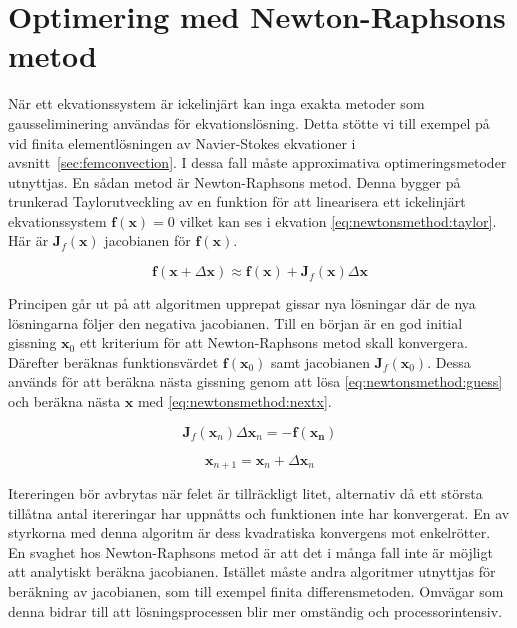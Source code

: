 \section{Optimering med Newton-Raphsons metod}

När ett ekvationssystem är ickelinjärt kan inga exakta metoder som gausseliminering användas
för ekvationslösning. Detta stötte vi till exempel på vid finita elementlösningen
av Navier-Stokes ekvationer i avsnitt~\ref{sec:femconvection}.
I dessa fall måste approximativa optimeringsmetoder utnyttjas. En sådan
metod är Newton-Raphsons metod. Denna bygger på trunkerad Taylorutveckling 
av en funktion för att linearisera ett ickelinjärt ekvationssystem
$\mathbf{f}(\mathbf{x}) = 0$
vilket kan ses i ekvation \eqref{eq:newtonsmethod:taylor}. Här är
$\mathbf{J}_f(\mathbf{x})$ jacobianen för $\mathbf{f}(\mathbf{x})$. 

\begin{equation}
\label{eq:newtonsmethod:taylor}
\mathbf{f}(\mathbf{x} + \Delta\mathbf{x}) \approx \mathbf{f}(\mathbf{x}) +
\mathbf{J}_f(\mathbf{x})\Delta\mathbf{x}
\end{equation}

\noindent
Principen går ut på att algoritmen upprepat gissar nya lösningar där de
nya lösningarna följer den negativa jacobianen. Till en början är en god initial gissning
$\mathbf{x}_0$ ett kriterium för att Newton-Raphsons metod skall konvergera. Därefter beräknas
funktionsvärdet $\mathbf{f}(\mathbf{x}_0)$ samt jacobianen $\mathbf{J}_f(\mathbf{x}_0)$.
Dessa används för att beräkna nästa gissning genom att lösa
\eqref{eq:newtonsmethod:guess} och beräkna nästa $\mathbf{x}$ med
\eqref{eq:newtonsmethod:nextx}. \cite{heath2002}

\begin{equation}
\label{eq:newtonsmethod:guess}
\mathbf{J}_f(\mathbf{x}_n)\Delta\mathbf{x}_n = -\mathbf{f}(\mathbf{x_n})
\end{equation}

\begin{equation}
\label{eq:newtonsmethod:nextx}
\mathbf{x}_{n+1} = \mathbf{x}_n + \Delta\mathbf{x}_n
\end{equation}

\noindent
Itereringen bör avbrytas när felet är tillräckligt litet, alternativ då ett största tillåtna antal itereringar har uppnåtts och funktionen inte har konvergerat. En av styrkorna 
med denna algoritm är dess kvadratiska konvergens mot enkelrötter. \cite{ympa95}
En svaghet hos Newton-Raphsons metod är att det i många fall inte är möjligt att analytiskt beräkna
jacobianen. Istället måste andra algoritmer utnyttjas för beräkning av jacobianen, som till exempel finita differensmetoden. Omvägar som denna bidrar till att lösningsprocessen blir mer omständig och processorintensiv.

